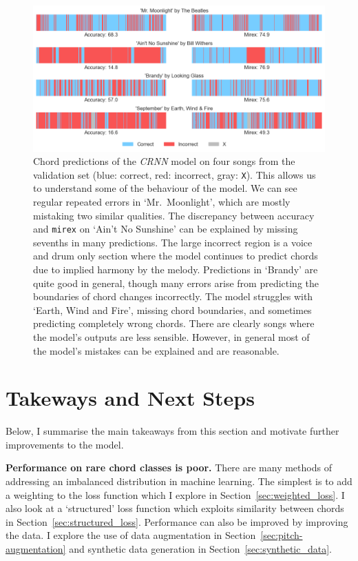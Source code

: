 \begin{figure}[ht]
    \centering
    \includegraphics[width=1.0\textwidth]{figures/chord_recognition_examples.png}
    \caption{Chord predictions of the \emph{CRNN} model on four songs from the validation set (blue: correct, red: incorrect, gray: \texttt{X}). This allows us to understand some of the behaviour of the model. We can see regular repeated errors in `Mr.\ Moonlight', which are mostly mistaking two similar qualities. The discrepancy between accuracy and \texttt{mirex} on `Ain't No Sunshine' can be explained by missing sevenths in many predictions. The large incorrect region is a voice and drum only section where the model continues to predict chords due to implied harmony by the melody. Predictions in `Brandy' are quite good in general, though many errors arise from predicting the boundaries of chord changes incorrectly. The model struggles with `Earth,  Wind and Fire', missing chord boundaries, and sometimes predicting completely wrong chords. There are clearly songs where the model's outputs are less sensible. However, in general most of the model's mistakes can be explained and are reasonable.}\label{fig:crnn_examples}
\end{figure}

\section{Takeways and Next Steps}

Below, I summarise the main takeaways from this section and motivate further improvements to the model.

\textbf{Performance on rare chord classes is poor.} There are many methods of addressing an imbalanced distribution in machine learning. The simplest is to add a weighting to the loss function which I explore in Section~\ref{sec:weighted_loss}. I also look at a `structured' loss function which exploits similarity between chords in Section~\ref{sec:structured_loss}. Performance can also be improved by improving the data. I explore the use of data augmentation in Section~\ref{sec:pitch-augmentation} and synthetic data generation in Section~\ref{sec:synthetic_data}.

